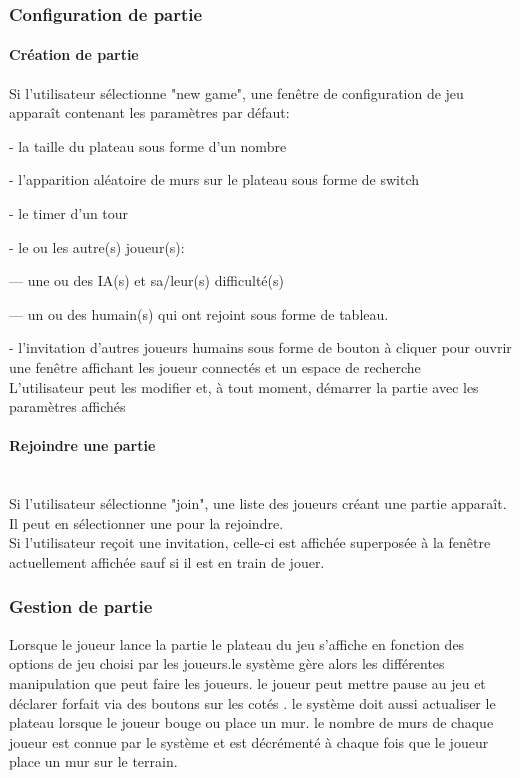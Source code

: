 \documentclass[french, utf8]{article}
\begin{document}
\subsubsection{Configuration de partie}
\paragraph{Création de partie}
\label{sec:CréationDePartie}
Si l’utilisateur sélectionne
"new game",
une fenêtre de configuration de jeu apparaît contenant les paramètres par défaut:
\item- la taille du plateau sous forme d'un nombre
\item- l'apparition aléatoire de murs sur le plateau sous forme de switch
\item- le timer d'un tour
\item- le ou les autre(s) joueur(s):
\item---  une ou des IA(s) et sa/leur(s) difficulté(s)
\item---  un ou des humain(s) qui ont rejoint sous forme de tableau.
\item- l'invitation d'autres joueurs humains sous forme de bouton à cliquer pour ouvrir une fenêtre affichant les joueur connectés et un espace de recherche
\\L'utilisateur peut les modifier et, à tout moment, démarrer la partie avec les paramètres
affichés

\paragraph{Rejoindre une partie}
\\Si l’utilisateur sélectionne
"join", une liste des joueurs créant une partie apparaît.
\\Il peut en sélectionner une pour la rejoindre.
\\Si l’utilisateur reçoit une invitation, celle-ci est affichée superposée à la fenêtre actuellement affichée sauf si il est en train de jouer.

\subsubsection{Gestion de partie}
\label{sec:GestionDePartie}
Lorsque le joueur lance la partie le plateau du jeu s'affiche en fonction des options de jeu choisi par les joueurs.le système gère alors les différentes manipulation que peut faire les joueurs. le joueur peut mettre pause au jeu et déclarer forfait via des boutons sur les cotés  . le système doit aussi actualiser le plateau lorsque le joueur bouge ou place un mur. le nombre de murs de chaque joueur est connue par le système et est décrémenté à chaque fois que le joueur place un mur sur le terrain.
\end{document}
